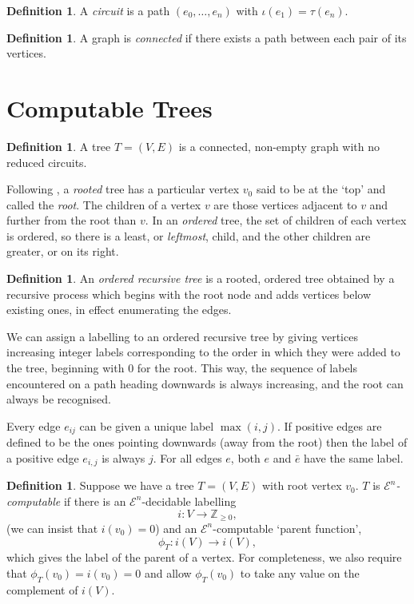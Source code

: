 \documentclass[a4paper]{article}
\newcommand{\grz}[1]{$\mathcal{E}^{#1}$}	%
\newcommand{\ZZ}{\mathbb{Z}}
\theoremstyle{plain}
\theoremstyle{definition}
\newtheorem{definition}[theorem]{Definition}
\begin{document}
\begin{definition}
A {\it circuit} is a path $(e_0, \dots, e_n)$ with $\iota(e_1) = \tau(e_n)$. 
\end{definition}

\begin{definition}
A graph is {\it connected} if there exists a path between each pair of its vertices.
\end{definition}

\section{Computable Trees \label{trees}}

\begin{definition}
A tree $T = (V,E)$ is a connected, non-empty graph with no reduced circuits.

Following \cite{Janson_2008}, a {\it rooted} tree has a particular vertex $v_0$ said to be at the `top' and called the {\it root}. The children of a vertex $v$ are those vertices adjacent to $v$ and further from the root than $v$. In an {\it ordered} tree, the set of children of each vertex is ordered, so there is a least, or {\it leftmost}, child, and the other children are greater, or on its right.
\end{definition}

\begin{definition}
An {\it ordered recursive tree} is a rooted, ordered tree obtained by a recursive process which begins with the root node and adds vertices below existing ones, in effect enumerating the edges.
\end{definition}

We can assign a labelling to an ordered recursive tree by giving vertices increasing integer labels corresponding to the order in which they were added to the tree, beginning with $0$ for the root. This way, the sequence of labels encountered on a path heading downwards is always increasing, and the root can always be recognised. 

Every edge $e_{ij}$ can be given a unique label $\max(i,j)$. 
If positive edges are defined to be the ones pointing downwards (away from the root) then the label of a positive edge $e_{i,j}$ is always $j$. For all 
edges $e$, both $e$ and $\bar e$  have the same label.

\begin{definition}
	Suppose we have a tree $T=(V,E)$ with root vertex $v_0$. $T$ is {\it \grz{n}-computable} if there is an \grz{n}-decidable labelling 
	\[i: V \rightarrow \ZZ_{\geq 0},\]
(we can insist that $i(v_0) = 0$) and an \grz{n}-computable `parent function',
\[\phi_T:i(V) \rightarrow i(V),\]
which gives the label of the parent of a vertex. For completeness, we also require that $\phi_T(v_0) = i(v_0) = 0$ and allow $\phi_T(v_0)$ to take any value on the complement of $i(V)$.
\end{definition}
\end{document}
